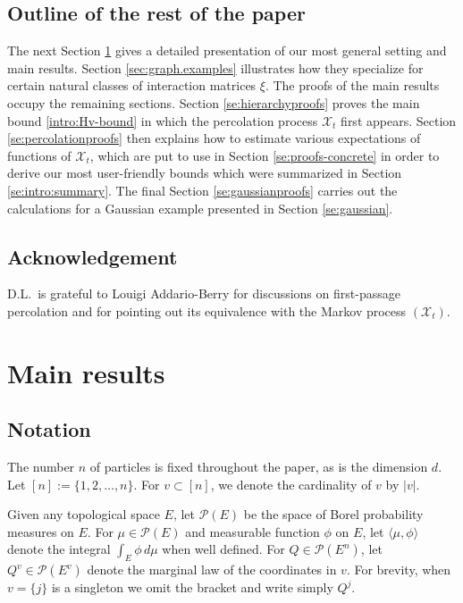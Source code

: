 \documentclass[11pt,reqno]{amsart}
\numberwithin{equation}{section}
\theoremstyle{definition}
\def\P{{\mathcal P}}
\def\X{{\mathcal X}}
\begin{document}
\subsection{Outline of the rest of the paper}

The next Section \ref{sec:main.results} gives a detailed presentation of our most general setting and main results. Section \ref{sec:graph.examples} illustrates how they specialize for certain natural classes of interaction matrices $\xi$.
The proofs of the main results occupy the remaining sections. Section \ref{se:hierarchyproofs} proves the main bound \eqref{intro:Hv-bound} in which the percolation process $\X_t$ first appears.
Section \ref{se:percolationproofs} then explains how to estimate various expectations of functions of $\X_t$, which are put to use in Section \ref{se:proofs-concrete} in order to derive our most user-friendly bounds which were summarized in Section \ref{se:intro:summary}. The final Section \ref{se:gaussianproofs} carries out the calculations for a Gaussian example presented in Section \ref{se:gaussian}.





\subsection*{Acknowledgement}

D.L.\ is grateful to Louigi Addario-Berry for discussions on first-passage percolation and for pointing out its equivalence with the Markov process $(\X_t)$.



\section{Main results} \label{sec:main.results}


\subsection{Notation}


The number $n$ of particles is fixed throughout the paper, as is the dimension $d$.
Let $[n]:=\{1,2, \dots, n\}$. For $v\subset [n]$, we denote  the cardinality of $v$ by $|v|$. 

Given any topological space $E$, let $\P(E)$ be the space of Borel probability measures on $E$. For  $\mu\in\P(E)$ and measurable function $\phi$ on $E$, let $\langle \mu,\phi\rangle$ denote  the integral $\int_{E}\phi\,  d\mu$ when well defined.
For $Q \in \P(E^n)$, let $Q^v \in \P(E^v)$ denote the marginal law of the coordinates in $v$.
For brevity, when $ v =\{j\} $ is a singleton we omit the bracket and write simply $Q^j$.
\end{document}
